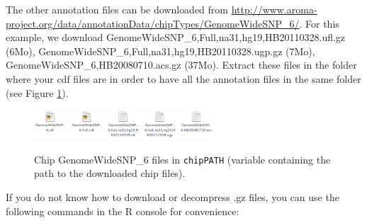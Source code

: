 \documentclass[a4paper,10pt]{article}
\begin{document}
		
			The other annotation files can be downloaded from \url{http://www.aroma-project.org/data/annotationData/chipTypes/GenomeWideSNP_6/}. For this example, we download GenomeWideSNP\_6,Full,na31,hg19,HB20110328.ufl.gz (6Mo), GenomeWideSNP\_6,Full,na31,hg19,HB20110328.ugp.gz (7Mo), GenomeWideSNP\_6,HB20080710.acs.gz (37Mo). Extract these files in the folder where your cdf files are in order to have all the annotation files in the same folder (see Figure \ref{chipfileinit}).

			\begin{figure}[!h]
				\centering
				\includegraphics[width=0.6\textwidth]{fig/chipFiles2}\\
				\caption{Chip GenomeWideSNP\_6 files in \texttt{chipPATH} (variable containing the path to the downloaded chip files).}%
				\label{chipfileinit}
			\end{figure}			
			

		
	
			If you do not know how to download or decompress .gz files, you can use the following commands in the R console for convenience:
	
\end{document}
